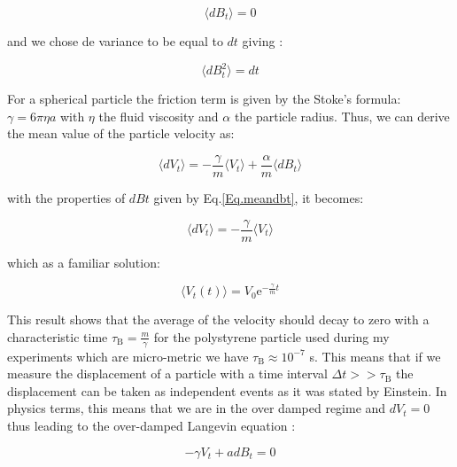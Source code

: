 \begin{equation}
	\langle dB_t \rangle  = 0
	\label{Eq.meandbt}
\end{equation}

and we chose de variance to be equal to $dt$ giving : 

\begin{equation}
	\langle dB_t ^2 \rangle = dt
\end{equation}

For a spherical particle the friction term is given by the Stoke's formula: $\gamma = 6\pi \eta a$ with $\eta$ the fluid viscosity and $\alpha$ the particle radius. Thus, we can derive the mean value of the particle velocity as:


\begin{equation}
	\langle dV_t \rangle = - \frac{\gamma}{m} \langle V_t \rangle + \frac{\alpha}{m} \langle dB_t \rangle
\end{equation}

with the properties of $dBt$ given by Eq.\ref{Eq.meandbt}, it becomes:

\begin{equation}
	\langle dV_t \rangle = - \frac{\gamma}{m} \langle V_t \rangle 
\end{equation}

which as a familiar solution:

\begin{equation}
	\langle V_t (t) \rangle =   V_0 \mathrm{e}^{-\frac{\gamma}{m} t}
	\label{Eq.int_V_langevin}
\end{equation}

This result shows that the average of the velocity should decay to zero with a characteristic time $\tau _\mathrm{B} = \frac{m}{\gamma}$ for the polystyrene  particle used during my experiments which are micro-metric we have $\tau_\mathrm{B} \approx 10^{-7}$ s. This means that if we measure the displacement of a particle with a time interval $ \Delta t  >> \tau _\mathrm{B} $ the displacement can be taken as independent events as it was stated by Einstein. In physics terms, this means that we are in the over damped regime and $dV_t = 0$ thus leading to the over-damped Langevin equation :

\begin{equation}
	-\gamma V_t  + adB_t = 0
	\label{Eq.overdamped_SDE}
\end{equation}

